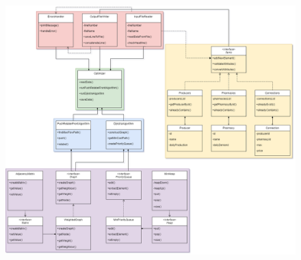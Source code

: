 \documentclass{article}
\begin{document}
{    \begin{figure} [h]
        \centering
        \includegraphics[width=15cm]{chart.png}
    \end{figure}


}
\end{document}
